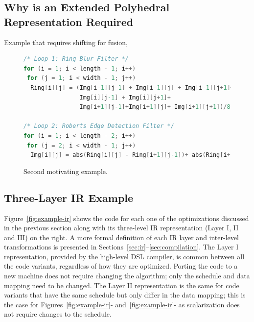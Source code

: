 \subsection{Why is an Extended Polyhedral Representation Required}

Example that requires shifting for fusion,

\begin{figure}[ht]

\begin{lstlisting}[language=C,escapechar=@]
/* Loop 1: Ring Blur Filter */
for (i = 1; i < length - 1; i++)
 for (j = 1; i < width - 1; j++)
  Ring[i][j] = (Img[i-1][j-1] + Img[i-1][j] + Img[i-1][j+1]+
                Img[i][j-1] + Img[i][j+1]+
                Img[i+1][j-1]+Img[i+1][j]+ Img[i+1][j+1])/8;

/* Loop 2: Roberts Edge Detection Filter */
for (i = 1; i < length - 2; i++)
 for (j = 2; i < width - 1; j++)
  Img[i][j] = abs(Ring[i][j] - Ring[i+1][j-1])+ abs(Ring[i+1][j] - Ring[i][j-1]);

\end{lstlisting}

\caption{\label{fig:motivating:example2} Second motivating example.}
\end{figure}



\subsection{Three-Layer IR Example}
Figure~\ref{fig:example-ir} shows the code for each one of the optimizations discussed in the previous section along with its three-level IR representation (Layer I, II and III) on the right. A more formal definition of each IR layer and inter-level transformations is presented in Sections~\ref{sec:ir}--\ref{sec:compilation}.  
The Layer I representation, provided by the high-level DSL compiler, is common between all the code variants, regardless of how they are optimized. Porting the code to a new machine does not require changing the algorithm; only the schedule and data mapping need to be changed.
The Layer II representation is the same for code variants that have the same schedule but only differ in the data mapping; this is the case for Figures~\ref{fig:example-ir}-\codetwo{} and~\ref{fig:example-ir}-\codethree{} as scalarization does not require changes to the schedule.

